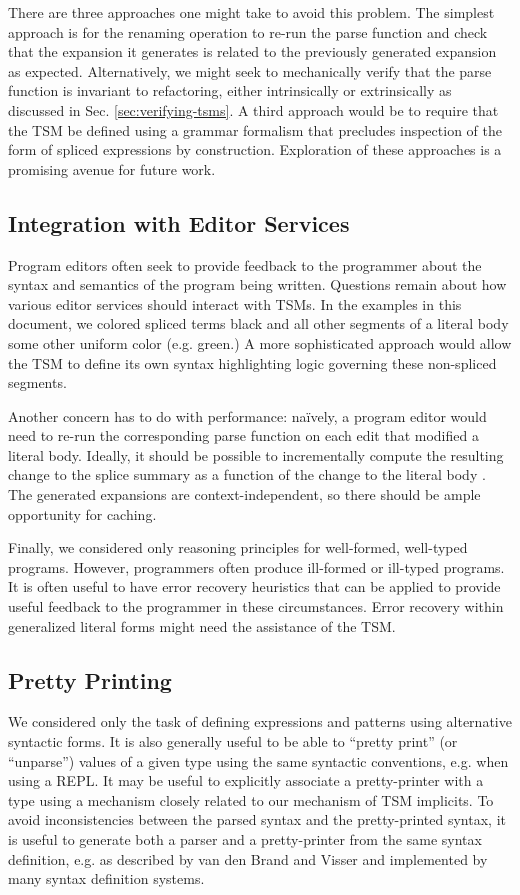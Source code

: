 There are three approaches one might take to avoid this problem. The simplest approach is for the renaming operation to re-run the parse function and check that the expansion it generates is related to the previously generated expansion as expected. Alternatively, we might seek to mechanically verify that the parse function is invariant to refactoring, either intrinsically or extrinsically as discussed in Sec. \ref{sec:verifying-tsms}. 
A third approach would be to require that the TSM be defined using a grammar formalism that precludes inspection of the form of spliced expressions by construction. Exploration of these approaches is a promising avenue for future work.

\subsection{Integration with Editor Services}\label{sec:editor-integration}
Program editors often seek to provide feedback to the programmer about the syntax and semantics of the program being written. Questions remain about how various editor services should interact with TSMs. In the examples in this document, we colored spliced terms black and all other segments of a literal body some other uniform color (e.g. green.) A more sophisticated approach would allow the TSM to define its own syntax highlighting logic governing these non-spliced segments.

Another concern has to do with performance: na\"ively, a program editor would need to re-run the corresponding parse function on each edit that modified a literal body. Ideally, it should be possible to incrementally compute the resulting change to the splice summary as a function of the change to the literal body \cite{Ghezzi:1979:IP:357062.357066}. The generated expansions are context-independent, so there should be ample opportunity for caching.

Finally, we considered only reasoning principles for well-formed, well-typed programs. However, programmers often produce ill-formed or ill-typed programs. It is often useful to have error recovery heuristics that can be applied to provide useful feedback to the programmer in these circumstances. Error recovery within generalized literal forms might need the assistance of the TSM.


\subsection{Pretty Printing}\label{sec:resugaring}
We considered only the task of defining expressions and patterns using alternative syntactic forms. It is also generally useful to be able to ``pretty print'' (or ``unparse'') values of a given type using the same syntactic conventions, e.g. when using a REPL. It may be useful to explicitly associate a pretty-printer with a type using a mechanism closely related to our mechanism of TSM implicits. To avoid inconsistencies between the parsed syntax and the pretty-printed syntax, it is useful to generate both a parser and a pretty-printer from the same syntax definition, e.g. as described by van den Brand and Visser \cite{DBLP:journals/tosem/BrandV96} and implemented by many syntax definition systems. 

